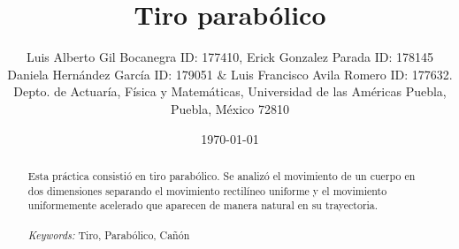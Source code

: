 \documentclass{article}
\begin{document}

\renewcommand{\footrulewidth}{1pt}
\renewcommand{\tablename}{Tabla}
\renewcommand{\figurename}{Figura}


\title{Tiro parabólico}
\author{\small{Luis Alberto Gil Bocanegra ID: 177410, Erick Gonzalez Parada ID: 178145}\\
 \small{Daniela Hernández García ID: 179051 $\&$ Luis Francisco Avila Romero ID: 177632.}\\		%
	   \small{Depto. de Actuaría, Física y Matemáticas, Universidad de las Américas Puebla, Puebla, M\'exico 72810}}
\date{\small{\today}}

\maketitle


\begin{abstract}
Esta práctica consistió en tiro parabólico. Se analizó el movimiento de un cuerpo en dos
dimensiones separando el movimiento rectilíneo uniforme y el movimiento uniformemente
acelerado que aparecen de manera natural en su trayectoria.
\\
\\
{\it Keywords:}  Tiro, Parabólico, Cañón 
\\
\\
\end{abstract}
\end{document}
